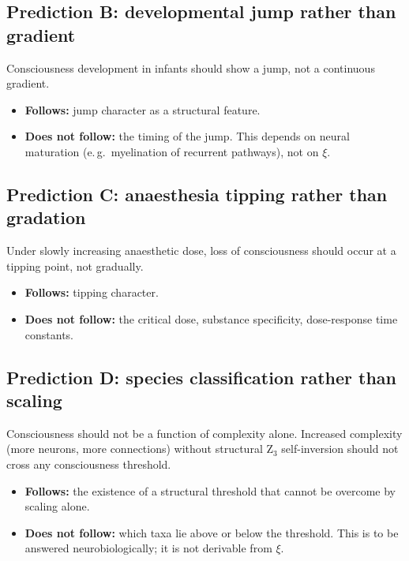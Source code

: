 \subsection{Prediction B: developmental jump rather than gradient}\label{sec:predictionB}

Consciousness development in infants should show a jump, not a continuous gradient.

\begin{itemize}
\item \textbf{Follows:} jump character as a structural feature.
\item \textbf{Does not follow:} the timing of the jump. This depends on neural maturation (e.\,g.\ myelination of recurrent pathways), not on $\xi$.
\end{itemize}

\subsection{Prediction C: anaesthesia tipping rather than gradation}\label{sec:predictionC}

Under slowly increasing anaesthetic dose, loss of consciousness should occur at a tipping point, not gradually.

\begin{itemize}
\item \textbf{Follows:} tipping character.
\item \textbf{Does not follow:} the critical dose, substance specificity, dose-response time constants.
\end{itemize}

\subsection{Prediction D: species classification rather than scaling}\label{sec:predictionD}

Consciousness should not be a function of complexity alone. Increased complexity (more neurons, more connections) without structural Z$_3$ self-inversion should not cross any consciousness threshold.

\begin{itemize}
\item \textbf{Follows:} the existence of a structural threshold that cannot be overcome by scaling alone.
\item \textbf{Does not follow:} which taxa lie above or below the threshold. This is to be answered neurobiologically; it is not derivable from $\xi$.
\end{itemize}


